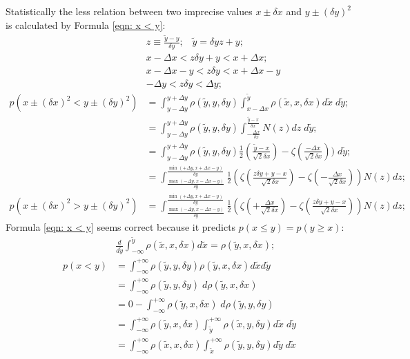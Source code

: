 \documentclass[twoside]{article}
\numberwithin{equation}{section}
\newcommand{\eqspace}{\;\;\;}
\begin{document}
Statistically the less relation between two imprecise values $x \pm \delta x$ and $y \pm (\delta y)^2$ is calculated by Formula \ref{eqn: x < y}:
\begin{align}
& z \equiv \frac{\tilde{y} - y}{\delta y}; \eqspace \tilde{y} = \delta y z + y; \\
& x - \Delta x < z \delta y + y < x + \Delta x; \\ & x - \Delta x - y < z \delta y < x + \Delta x - y \\
& - \Delta y < z \delta y < \Delta y; \\
p\left( x \pm (\delta x)^2 < y \pm (\delta y)^2 \right) & = 
  \int_{y - \Delta y}^{y + \Delta y} \rho(\tilde{y}, y, \delta y) 
    \int_{x - \Delta x}^{\tilde{y}} \rho(\tilde{x}, x, \delta x) d \tilde{x} \;d \tilde{y}; \\
& = \int_{y - \Delta y}^{y + \Delta y} \rho(\tilde{y}, y, \delta y) 
  \int_{-\frac{\Delta x}{\delta x}}^{\frac{\tilde{y} - x}{\delta x}} N(z) d z \;d \tilde{y}; \\
& = \int_{y - \Delta y}^{y + \Delta y} \rho(\tilde{y}, y, \delta y) 
      \frac{1}{2}(\frac{\tilde{y} - x}{\sqrt{2} \delta x}) - \zeta(\frac{-\Delta x}{\sqrt{2} \delta x})) \;d \tilde{y}; \\
& = \int_{\frac{\max(-\Delta y, x - \Delta x - y)}{\delta y}}^{\frac{\min(+\Delta y, x + \Delta x - y)}{\delta y}} 
      \frac{1}{2} \left(\zeta(\frac{z \delta y + y - x}{\sqrt{2} \delta x}) - \zeta(-\frac{\Delta x}{\sqrt{2} \delta x})\right) N(z) d z; \\
p\left( x \pm (\delta x)^2 > y \pm (\delta y)^2 \right) & =     
   \int_{\frac{\max(-\Delta y, x - \Delta x - y)}{\delta y}}^{\frac{\min(+\Delta y, x + \Delta x - y)}{\delta y}} 
      \frac{1}{2} \left(\zeta(+\frac{\Delta x}{\sqrt{2} \delta x}) - \zeta(\frac{z \delta y + y - x}{\sqrt{2} \delta x})\right) N(z) d z;
\end{align}
Formula \eqref{eqn: x < y} seems correct because it predicts $p(x \le y) = p(y \ge x)$:
\begin{align}
& \frac{d}{d \tilde{y}} \int_{-\infty}^{\tilde{y}} \rho(\tilde{x}, x, \delta x) d \tilde{x} = \rho(\tilde{y}, x, \delta x); \\
p(x< y) & = \int_{-\infty}^{+\infty} \rho(\tilde{y}, y, \delta y) \rho(\tilde{y}, x, \delta x) d \tilde{x} d \tilde{y} \\
& = \int_{-\infty}^{+\infty} \rho(\tilde{y}, y, \delta y) \;d \rho(\tilde{y}, x, \delta x) \\
& = 0 - \int_{-\infty}^{+\infty} \rho(\tilde{y}, x, \delta x) \;d \rho(\tilde{y}, y, \delta y) \\
& = \int_{-\infty}^{+\infty} \rho(\tilde{y}, x, \delta x) 
\int_{\tilde{y}}^{+\infty} \rho(\tilde{x}, y, \delta y) 
d \tilde{x} \;d \tilde{y} \\
& = \int_{-\infty}^{+\infty} \rho(\tilde{x}, x, \delta x) 
\int_{\tilde{x}}^{+\infty} \rho(\tilde{y}, y, \delta y) 
d \tilde{y} \;d \tilde{x}
\end{align}
\end{document}
